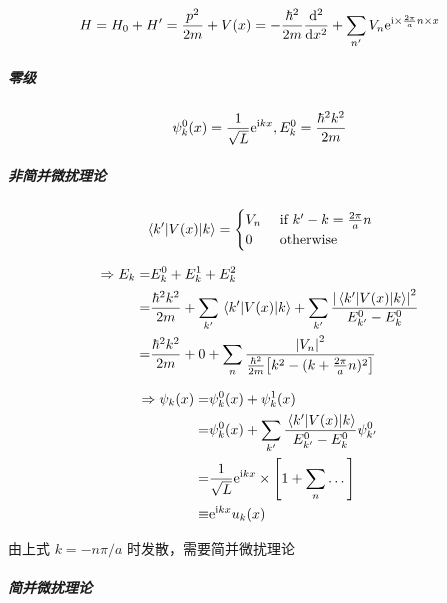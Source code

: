 \[ H = H_0 + H' = \frac{p^2}{2 m} + V(x) = - \frac{\hbar^2}{2 m} \dv[2]{x} + \sum_{n'} V_n \mathrm{e}^{\mathrm{i} \times \frac{2 \pi}{a} n \times x} \]

\subparagraph{零级}

\[ \psi_{k}^{0}(x) = \frac{1}{\sqrt{L}} \mathrm{e}^{\mathrm{i} k x}, E_{k}^0 = \frac{\hbar^2 k^2}{2 m} \]

\subparagraph{非简并微扰理论}

\[ \mel{k'}{V(x)}{k} = \begin{cases}
        V_n & \text{ if } k' - k = \frac{2 \pi}{a} n \\
        0   & \text{ otherwise }
    \end{cases} \]
\begin{multicols}{2}
    \begin{align*}
        \Rightarrow E_{k} = & E_k^0 + E_k^1 + E_k^2                                                                                                  \\
        =                   & \frac{\hbar^2 k^2}{2 m} + \sum_{k'} \mel{k'}{V(x)}{k} + \sum_{k'} \frac{\qty|\mel{k'}{V(x)}{k}|^2}{E_{k'}^0 - E_{k}^0} \\
        =                   & \frac{\hbar^2 k^2}{2 m} + 0 + \sum_n \frac{\qty|V_n|^2}{\frac{\hbar^2}{2 m} \qty[k^2 - (k + \frac{2 \pi}{a} n)^2]}     \\
    \end{align*}

    \begin{align*}
        \Rightarrow \psi_{k}(x) = & \psi_{k}^0(x) + \psi_{k}^1(x)                                                      \\
        =                         & \psi_{k}^0(x) + \sum_{k'} \frac{\mel{k'}{V(x)}{k}}{E_{k'}^0 - E_{k}^0} \psi_{k'}^0 \\
        =                         & \frac{1}{\sqrt{L}} \mathrm{e}^{\mathrm{i} k x} \times \qty[1 + \sum_n \dots]                   \\
        \equiv                    & \mathrm{e}^{\mathrm{i} k x} u_k(x)
    \end{align*}
\end{multicols}

由上式 $ k = - n \pi / a $ 时发散，需要简并微扰理论

\subparagraph{简并微扰理论}

